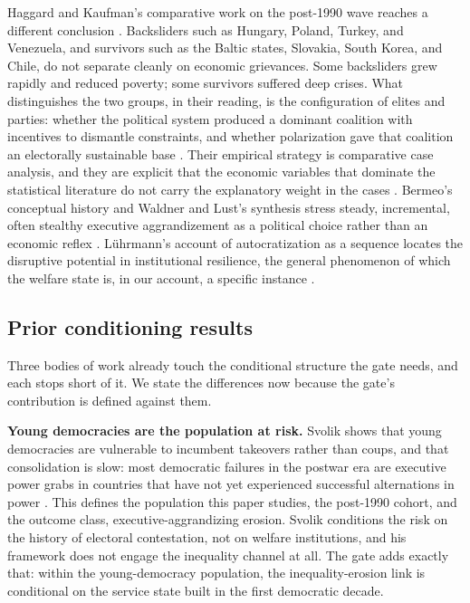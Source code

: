 Haggard and Kaufman's comparative work on the post-1990 wave reaches a different conclusion \citep{HaggardKaufman2021, HaggardKaufman2016}. Backsliders such as Hungary, Poland, Turkey, and Venezuela, and survivors such as the Baltic states, Slovakia, South Korea, and Chile, do not separate cleanly on economic grievances. Some backsliders grew rapidly and reduced poverty; some survivors suffered deep crises. What distinguishes the two groups, in their reading, is the configuration of elites and parties: whether the political system produced a dominant coalition with incentives to dismantle constraints, and whether polarization gave that coalition an electorally sustainable base \citep{HaggardKaufman2021, Svolik2019}. Their empirical strategy is comparative case analysis, and they are explicit that the economic variables that dominate the statistical literature do not carry the explanatory weight in the cases \citep{HaggardKaufman2021}. Bermeo's conceptual history and Waldner and Lust's synthesis stress steady, incremental, often stealthy executive aggrandizement as a political choice rather than an economic reflex \citep{WaldnerLust2018, Bermeo2016}. Lührmann's account of autocratization as a sequence locates the disruptive potential in institutional resilience, the general phenomenon of which the welfare state is, in our account, a specific instance \citep{Luhrmann2021}.

\subsection{Prior conditioning results}

Three bodies of work already touch the conditional structure the gate needs, and each stops short of it. We state the differences now because the gate's contribution is defined against them.

\textbf{Young democracies are the population at risk.} Svolik shows that young democracies are vulnerable to incumbent takeovers rather than coups, and that consolidation is slow: most democratic failures in the postwar era are executive power grabs in countries that have not yet experienced successful alternations in power \citep{Svolik2015}. This defines the population this paper studies, the post-1990 cohort, and the outcome class, executive-aggrandizing erosion. Svolik conditions the risk on the history of electoral contestation, not on welfare institutions, and his framework does not engage the inequality channel at all. The gate adds exactly that: within the young-democracy population, the inequality-erosion link is conditional on the service state built in the first democratic decade.

